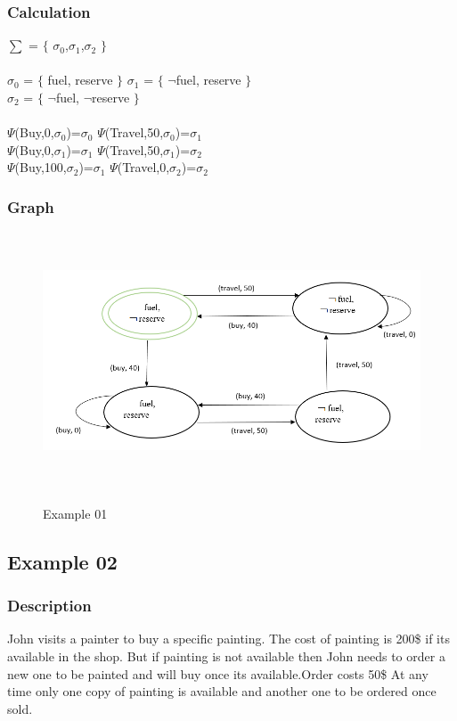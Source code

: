 \documentclass[11pt]{article}
\begin{document}
	\subsubsection{Calculation}\label{par:p301}\par
	$\sum$ = $\lbrace$ $\sigma_{0}$,$\sigma_{1}$,$\sigma_{2}$ $\rbrace$\\ \\
	$\sigma_{0}$ = $\lbrace$ fuel, reserve $\rbrace$ \indent $\sigma_{1}$ = $\lbrace$ $\neg$fuel, reserve $\rbrace$\\
	$\sigma_{2}$ = $\lbrace$ $\neg$fuel, $\neg$reserve $\rbrace$ 
	\\ \\
	$\Psi$(Buy,0,$\sigma_{0}$)=$\sigma_{0}$ \indent $\Psi$(Travel,50,$\sigma_{0}$)=$\sigma_{1}$\\
	$\Psi$(Buy,0,$\sigma_{1}$)=$\sigma_{1}$ \indent $\Psi$(Travel,50,$\sigma_{1}$)=$\sigma_{2}$\\
	$\Psi$(Buy,100,$\sigma_{2}$)=$\sigma_{1}$ \indent $\Psi$(Travel,0,$\sigma_{2}$)=$\sigma_{2}$\\
	\subsubsection{Graph}\label{par:p401}
	\begin{figure}[H]
		\centering
		\includegraphics[width=6in,height=3in]{./media/ex01.png}
		\label{Figure:f01}
		\caption{Example 01}
	\end{figure}
	\subsection{Example 02}\label{example:ex02}
	\subsubsection{Description}\label{par:p102}
	John visits a painter to buy a specific painting. The cost of painting is 200\$ if its available in the shop. But if painting is not available then John needs to order a new one to be painted and will buy once its available.Order costs 50\$ At any time only one copy of painting is available and another one to be ordered once sold. 
	
\end{document}

